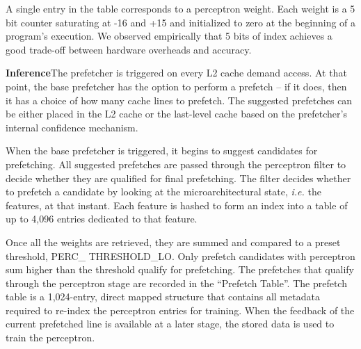 
A single entry in the table corresponds to a perceptron weight.  Each weight
is a 5 bit counter saturating at -16 and +15 and initialized to zero at the
beginning of a program's execution. We observed empirically that 5 bits of
index achieves a good trade-off between hardware overheads and accuracy.


\textbf{Inference}\newline The prefetcher is triggered on every L2 cache
demand access.  At that point, the base prefetcher has the option to perform a
prefetch -- if it does, then it has a choice of how many cache lines to
prefetch.  The suggested prefetches can be either placed in the L2 cache or
the last-level cache based on the prefetcher's internal confidence mechanism.

When the base prefetcher is triggered, it begins to suggest candidates for
prefetching.  All suggested prefetches are passed through the perceptron
filter to decide whether they are qualified for final prefetching.  The filter
decides whether to prefetch a candidate by looking at the microarchitectural
state, \textit{i.e.} the features, at that instant.  Each feature is hashed to
form an index into a table of up to 4,096 entries dedicated to that feature.

Once all the weights are retrieved, they are summed and compared to a preset
threshold, PERC\_ THRESHOLD\_LO.  Only prefetch candidates with perceptron sum
higher than the threshold qualify for prefetching.  The prefetches that
qualify through the perceptron stage are recorded in the ``Prefetch Table''.
The prefetch table is a 1,024-entry, direct mapped structure that contains all
metadata required to re-index the perceptron entries for training.  When the
feedback of the current prefetched line is available at a later stage, the
stored data is used to train the perceptron.


